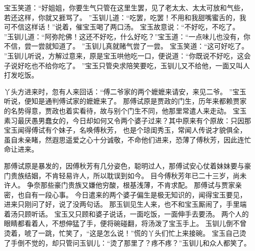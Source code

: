 \par
宝玉笑道：“好姐姐，你要生气只管在这里生罢，见了老太太、太太可放和气些，若还这样，你就又捱骂了。
”玉钏儿道：“吃罢，吃罢！不用和我甜嘴蜜舌的，我可不信这样话！”说着，催宝玉喝了两口汤。
宝玉故意说：“不好吃，不吃了。
”玉钏儿道：“阿弥陀佛！这还不好吃，什么好吃？”宝玉道：“一点味儿也没有，你不信，尝一尝就知道了。
”玉钏儿真就赌气尝了一尝。
宝玉笑道：“这可好吃了。
”玉钏儿听说，方解过意来，原是宝玉哄他吃一口，便说道：“你既说不好吃，这会子说好吃也不给你吃了。
”宝玉只管央求陪笑要吃，玉钏儿又不给他，一面又叫人打发吃饭。
\par
丫头方进来时，忽有人来回话：“傅二爷家的两个嬷嬷来请安，来见二爷。
”宝玉听说，便知是通判傅试家的嬷嬷来了。
那傅试原是贾政的门生，历年来都赖贾家的名势得意，贾政也着实看待，故与别个门生不同，他那里常遣人来走动。
宝玉素习最厌愚男蠢女的，今日却如何又令两个婆子过来？其中原来有个原故：只因那宝玉闻得傅试有个妹子，名唤傅秋芳，
也是个琼闺秀玉，常闻人传说才貌俱全，虽自未亲睹，然遐思遥爱之心十分诚敬，不命他们进来，恐薄了傅秋芳，因此连忙命让进来。
\par
那傅试原是暴发的，因傅秋芳有几分姿色，聪明过人，那傅试安心仗着妹妹要与豪门贵族结姻，不肯轻易许人，所以耽误到如今。
目今傅秋芳年已二十三岁，尚未许人。
争奈那些豪门贵族又嫌他穷酸，根基浅薄，不肯求配。
那傅试与贾家亲密，也自有一段心事。
今日遣来的两个婆子偏生是极无知识的，闻得宝玉要见，进来只刚问了好，说了没两句话。
那玉钏见生人来，也不和宝玉厮闹了，手里端着汤只顾听话。
宝玉又只顾和婆子说话，一面吃饭，一面伸手去要汤。
两个人的眼睛都看着人，不想伸猛了手，便将碗碰翻，将汤泼了宝玉手上。
玉钏儿倒不曾烫着，唬了一跳，忙笑了，“这是怎么说！”慌的丫头们忙上来接碗。
宝玉自己烫了手倒不觉的，却只管问玉钏儿：“烫了那里了？疼不疼？”玉钏儿和众人都笑了。
